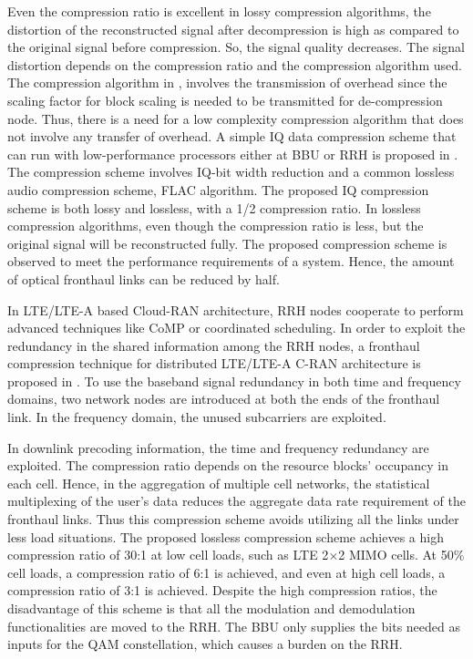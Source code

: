 \begin{multicols}{2}
\begin{itemize}
Even the compression ratio is excellent in lossy compression algorithms, the distortion of the reconstructed signal after decompression is high as compared to the original signal before compression. So, the signal quality decreases. The signal distortion depends on the compression ratio and the compression algorithm used. The compression algorithm in \cite{art3-key63}, involves the transmission of overhead since the scaling factor for block scaling is needed to be transmitted for de-compression node. Thus, there is a need for a low complexity compression algorithm that does not involve any transfer of overhead. A simple IQ data compression scheme that can run with low-performance processors either at BBU or RRH is proposed in \cite{art3-key64}. The compression scheme involves IQ-bit width reduction and a common lossless audio compression scheme, FLAC algorithm. The proposed IQ compression scheme is both lossy and lossless, with a 1/2 compression ratio. In lossless compression algorithms, even though the compression ratio is less, but the original signal will be reconstructed fully. The proposed compression scheme is observed to meet the performance requirements of a system. Hence, the amount of optical fronthaul links can be reduced by half. 

In LTE/LTE-A based Cloud-RAN architecture, RRH nodes cooperate to perform advanced techniques like CoMP or coordinated scheduling. In order to exploit the redundancy in the shared information among the RRH nodes, a fronthaul compression technique for distributed LTE/LTE-A C-RAN architecture is proposed in \cite{art3-key65}. To use the baseband signal redundancy in both time and frequency domains, two network nodes are introduced at both the ends of the fronthaul link. In the frequency domain, the unused subcarriers are exploited.

In downlink precoding information, the time and frequency redundancy are exploited. The compression ratio depends on the resource blocks’ occupancy in each cell. Hence, in the aggregation of multiple cell networks, the statistical multiplexing of the user’s data reduces the aggregate data rate requirement of the fronthaul links. Thus this compression scheme avoids utilizing all the links under less load situations. The proposed lossless compression scheme achieves a high compression ratio of 30:1 at low cell loads, such as LTE 2$\times$2 MIMO cells. At 50\% cell loads, a compression ratio of 6:1 is achieved, and even at high cell loads, a compression ratio of 3:1 is achieved. Despite the high compression ratios, the disadvantage of this scheme is that all the modulation and demodulation functionalities are moved to the RRH. The BBU only supplies the bits needed as inputs for the QAM constellation, which causes a burden on the RRH. 


\end{itemize}
\end{multicols}
